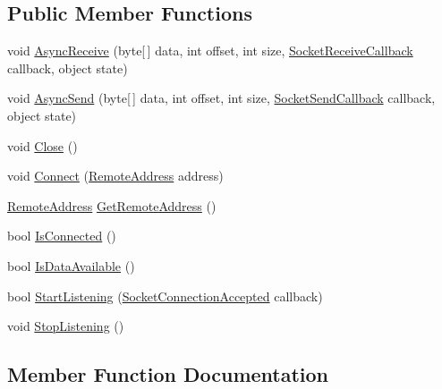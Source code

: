 \subsection*{Public Member Functions}
\begin{DoxyCompactItemize}
\item 
void \hyperlink{interface_o_t_a_1_1_callbacks_1_1_i_socket_ac76ca3d475a9a054c191f0fd9b2132ad}{Async\+Receive} (byte\mbox{[}$\,$\mbox{]} data, int offset, int size, \hyperlink{namespace_o_t_a_1_1_callbacks_ae072013cce199869fb359bea97dbdb17}{Socket\+Receive\+Callback} callback, object state)
\item 
void \hyperlink{interface_o_t_a_1_1_callbacks_1_1_i_socket_a1e849909a4537800263ee569cb536ca0}{Async\+Send} (byte\mbox{[}$\,$\mbox{]} data, int offset, int size, \hyperlink{namespace_o_t_a_1_1_callbacks_a23847c8d354ca8b53cfd6a3f466e0099}{Socket\+Send\+Callback} callback, object state)
\item 
void \hyperlink{interface_o_t_a_1_1_callbacks_1_1_i_socket_a1c503b157c5a7dbb852b15432f1100d9}{Close} ()
\item 
void \hyperlink{interface_o_t_a_1_1_callbacks_1_1_i_socket_a18907f6fc1d2e30adc7e258b036b0700}{Connect} (\hyperlink{class_o_t_a_1_1_callbacks_1_1_remote_address}{Remote\+Address} address)
\item 
\hyperlink{class_o_t_a_1_1_callbacks_1_1_remote_address}{Remote\+Address} \hyperlink{interface_o_t_a_1_1_callbacks_1_1_i_socket_ad93238268bca0052105eba833b596c20}{Get\+Remote\+Address} ()
\item 
bool \hyperlink{interface_o_t_a_1_1_callbacks_1_1_i_socket_a2e9241b0a59990d1ff4a47c50fe2c585}{Is\+Connected} ()
\item 
bool \hyperlink{interface_o_t_a_1_1_callbacks_1_1_i_socket_a4275299b4d44d4a60a29697248487fac}{Is\+Data\+Available} ()
\item 
bool \hyperlink{interface_o_t_a_1_1_callbacks_1_1_i_socket_a4bd96e0a7e0898a9b2442f34794297ea}{Start\+Listening} (\hyperlink{namespace_o_t_a_1_1_callbacks_afb9741507c3efff20f6f9a86dc42af20}{Socket\+Connection\+Accepted} callback)
\item 
void \hyperlink{interface_o_t_a_1_1_callbacks_1_1_i_socket_a09346c574bd7994f9648a2705e138e5c}{Stop\+Listening} ()
\end{DoxyCompactItemize}


\subsection{Member Function Documentation}
\hypertarget{interface_o_t_a_1_1_callbacks_1_1_i_socket_ac76ca3d475a9a054c191f0fd9b2132ad}{}
